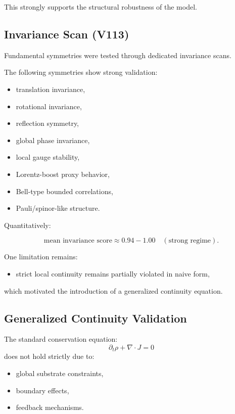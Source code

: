 \documentclass[11pt]{article}
\begin{document}
This strongly supports the structural robustness of the model.

\subsection{Invariance Scan (V113)}

Fundamental symmetries were tested through dedicated invariance scans.

The following symmetries show strong validation:

\begin{itemize}
\item translation invariance,
\item rotational invariance,
\item reflection symmetry,
\item global phase invariance,
\item local gauge stability,
\item Lorentz-boost proxy behavior,
\item Bell-type bounded correlations,
\item Pauli/spinor-like structure.
\end{itemize}

Quantitatively:

\begin{equation}
\text{mean invariance score} \approx 0.94 - 1.00 \quad (\text{strong regime}).
\end{equation}

One limitation remains:

\begin{itemize}
\item strict local continuity remains partially violated in naive form,
\end{itemize}

which motivated the introduction of a generalized continuity equation.

\subsection{Generalized Continuity Validation}

The standard conservation equation:
\begin{equation}
\partial_t \rho + \nabla \cdot J = 0
\end{equation}
does not hold strictly due to:

\begin{itemize}
\item global substrate constraints,
\item boundary effects,
\item feedback mechanisms.
\end{itemize}
\end{document}
